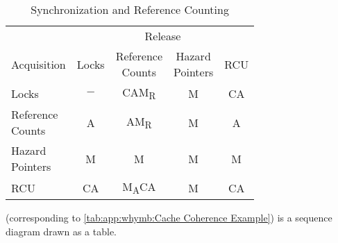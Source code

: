 \begin{table}
\renewcommand*{\arraystretch}{1.25}
\small
\centering
\begin{tabular}{lcccc}
	\toprule
	& \multicolumn{4}{c}{Release} \\
	\cmidrule(l){2-5}
	Acquisition	& Locks
				& \parbox[c]{.5in}{Reference\\Counts}
					& \parbox[c]{.5in}{Hazard\\Pointers}
						& RCU \\
	 \cmidrule(l){2-5}
	Locks		& $-$	& CAM\textsubscript{R}	& M	& CA  \\
	\parbox[c][6ex]{.6in}{Reference\\Counts}
			& A	& AM\textsubscript{R}    & M	& A   \\
	\parbox[c][6ex]{.6in}{Hazard\\Pointers}
			& M	& M	& M	& M   \\
	RCU		& CA	& M\textsubscript{A}CA	& M	& CA  \\
	\bottomrule
\end{tabular}

\vspace{5pt}\hfill
{}
\caption{Synchronization and Reference Counting}
\label{tab:app:styleguide:Synchronization and Reference Counting}
\end{table}

(corresponding to
\cref{tab:app:whymb:Cache Coherence Example})
is a sequence diagram drawn as a table.

